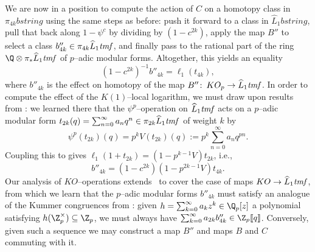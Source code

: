 We are now in a position to compute the action of \(C\) on a homotopy class in \(\pi_{4k} b\mathit{string}\) using the same steps as before: push it forward to a class in \(\widehat L_1 b\mathit{string}\), pull that back along \(1 - \psi^c\) by dividing by \((1 - c^{2k})\), apply the map \(B''\) to select a class \(b''_{4k} \in \pi_{4k} \widehat L_1 \mathit{tmf}\), and finally pass to the rational part of the ring \(\Q \otimes \pi_* \widehat L_1 \tmf\) of \(p\)--adic modular forms.  Altogether, this yields an equality \[(1 - c^{2k})^{-1} b''_{4k} = \ell_1(t_{4k}),\] where \(b''_{4k}\) is the effect on homotopy of the map \(B''\colon\thinspace KO_p \to \widehat L_1 \mathit{tmf}\).  In order to compute the effect of the \(K(1)\)--local logarithm, we must draw upon results from : we learned there that the \(\psi^p\)--operation on \(\widehat L_1 \mathit{tmf}\) acts on a \(p\)--adic modular form \(t_{2k}(q) = \sum_{n=0}^\infty a_n q^n \in \pi_{2k} \widehat L_1 \mathit{tmf}\) of weight \(k\) by \[\psi^p(t_{2k})(q) = p^k V(t_{2k})(q) := p^k \sum_{n=0}^\infty a_n q^{pn}.\]  Coupling this to  gives \(\ell_1(1 + t_{2k}) = (1 - p^{k-1}V)t_{2k}\), i.e., \[b''_{4k} = (1 - c^{2k}) (1 - p^{2k-1}V) t_{4k}.\]  Our analysis of \(KO\)--operations extends~\cite[Proposition 11.4.iv]{AHR} to cover the case of maps \(KO \to \widehat L_1 \mathit{tmf}\), from which we learn that the \(p\)--adic modular forms \(b''_{4k}\) must satisfy an analogue of the Kummer congruences from : given \(h = \sum_{k=0}^\infty a_k z^k \in \Q_p[z]\) a polynomial satisfying \(h(\Z_p^\times) \subseteq \Z_p\), we must always have \(\sum_{k=0}^\infty a_{2k} b''_{4k} \in \Z_p\ps{q}\).  Conversely, given such a sequence we may construct a map \(B''\) and maps \(B\) and \(C\) commuting with it.


